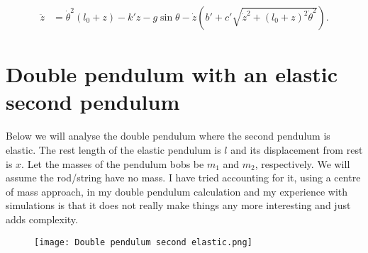 \documentclass[12pt,a4paper,portrait]{article}
\begin{document}
\begin{align*}
	\ddot{z} &= \dot{\theta}^2(l_0+z) - k'z - g\sin{\theta} -\dot{z}\left(b'+c'\sqrt{\dot{z}^2+(l_0+z)^2\dot{\theta}^2}\right).
\end{align*}


\section{Double pendulum with an elastic second pendulum}
Below we will analyse the double pendulum where the second pendulum is elastic. The rest length of the elastic pendulum is $l$ and its displacement from rest is $x$. Let the masses of the pendulum bobs be $m_1$ and $m_2$, respectively. We will assume the rod/string have no mass. I have tried accounting for it, using a centre of mass approach, in my double pendulum calculation and my experience with simulations is that it does not really make things any more interesting and just adds complexity. 
\begin{figure}[H]
	\texttt{[image: Double pendulum second elastic.png]}
\end{figure}
\end{document}
